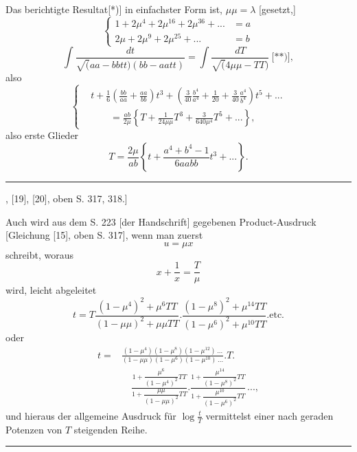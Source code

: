 \begingroup
\makeatletter\tagsleft@true\let\veqno\@@leqno\makeatother
\clearpage{}
\noindent {\small[S. 226]}
\par\indent Das berichtigte Resultat[*)] in einfachster Form ist, $\mu\mu=\lambda$ [gesetzt,]
\begin{equation}
\left\{\begin{aligned}
1+2\mu^4+2\mu^{16}+2\mu^{36}+{.}{.}{.}&=a\\
2\mu+2\mu^9+2\mu^{25}+{.}{.}{.}&=b
\end{aligned}\right.\tag*{[19a]}
\end{equation}
\begin{equation}
\int\frac{dt}{\surd(aa-bbtt)(bb-aatt)}=\int\frac{dT}{\surd(4\mu\mu-TT)}\ \text{[**)]},\tag*{[18a]}
\end{equation}
\noindent also
\begin{equation}
\left\{\begin{aligned}
&t+\frac16\left(\frac{bb}{aa}+\frac{aa}{bb}\right)t^3+\left(\frac3{40}\frac{b^4}{a^4}+\frac1{20}+\frac3{40}\frac{a^4}{b^4}\right)t^5+{.}{.}{.}\\[4pt]
&\qquad=\frac{ab}{2\mu}\left\{T+\frac1{24\mu\mu}T^3+\frac3{640\mu^4}T^5+{.}{.}{.}\right\},
\end{aligned}\right.\tag*{[26]}
\end{equation}
\noindent also erste Glieder
\begin{equation}
T=\frac{2\mu}{ab}\left\{t+\frac{a^4+b^4-1}{6aabb}t^3+{.}{.}{.}\right\}.\tag*{[27]}
\end{equation}
\par\bigskip\noindent\rule{.25\linewidth}{.4pt}\par\smallskip
{\small\par\indent [*) Siehe die Gleichungen [18], [19], [20], oben S. 317, 318.]\par
{}\par}
\clearpage{}
\par\indent Auch wird aus dem S. 223 [der Handschrift] gegebenen Product-Ausdruck [Gleichung [15], oben S. 317], wenn man zuerst
\[u=\mu x\]
\noindent schreibt, woraus
\[x+\frac1x=\frac T\mu\]
\noindent wird, leicht abgeleitet
\[t=T\frac{(1-\mu^4)^2+\mu^6TT}{(1-\mu\mu)^2+\mu\mu TT}.\frac{(1-\mu^8)^2+\mu^{14}TT}{(1-\mu^6)^2+\mu^{10}TT}.\text{etc.}\]
\noindent oder
{\small\[\begin{aligned}
t={}&\frac{(1-\mu^4)(1-\mu^8)(1-\mu^{12})\,{.}{.}{.}}{(1-\mu\mu)(1-\mu^6)(1-\mu^{10})\,{.}{.}{.}}.T.\\[6pt]
&\quad\frac{1+\dfrac{\mu^6}{(1-\mu^4)^2}TT}{1+\dfrac{\mu\mu}{(1-\mu\mu)^2}TT}.\frac{1+\dfrac{\mu^{14}}{(1-\mu^8)^2}TT}{1+\dfrac{\mu^{10}}{(1-\mu^6)^2}TT}\,{.}{.}{.},
\end{aligned}\]}
\noindent und hieraus der allgemeine Ausdruck für $\log\frac tT$ vermittelst einer nach geraden Potenzen von $T$ steigenden Reihe.
\par\bigskip\begin{center}\rule{.18\linewidth}{.4pt}\end{center}
\clearpage
\endgroup
